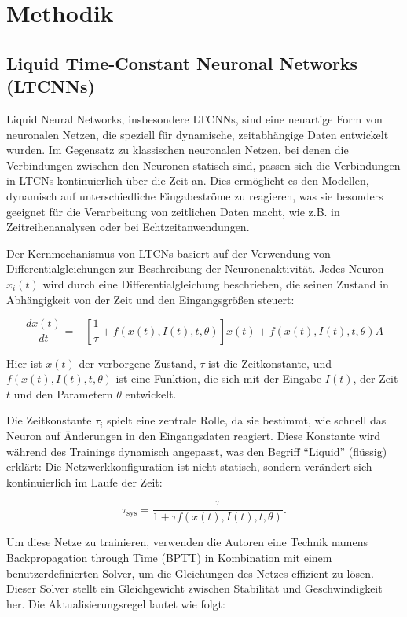 \documentclass[11pt,ngerman,a4paper,]{article}
\begin{document}
\clearpage
\newpage

\section{Methodik}\label{methodik}

\subsection{Liquid Time-Constant Neuronal Networks (LTCNNs)}\label{liquid-time-constant-neuronal-networks-ltcnns}

Liquid Neural Networks, insbesondere LTCNNs, sind eine neuartige Form von neuronalen Netzen, die speziell für dynamische, zeitabhängige Daten entwickelt wurden. Im Gegensatz zu klassischen neuronalen Netzen, bei denen die Verbindungen zwischen den Neuronen statisch sind, passen sich die Verbindungen in LTCNs kontinuierlich über die Zeit an. Dies ermöglicht es den Modellen, dynamisch auf unterschiedliche Eingabeströme zu reagieren, was sie besonders geeignet für die Verarbeitung von zeitlichen Daten macht, wie z.B. in Zeitreihenanalysen oder bei Echtzeitanwendungen.

Der Kernmechanismus von LTCNs basiert auf der Verwendung von Differentialgleichungen zur Beschreibung der Neuronenaktivität. Jedes Neuron \(x_i(t)\) wird durch eine Differentialgleichung beschrieben, die seinen Zustand in Abhängigkeit von der Zeit und den Eingangsgrößen steuert:

\[
\frac{dx(t)}{dt} = -\left[\frac{1}{\tau} + f(x(t), I(t), t, \theta)\right] x(t) + f(x(t), I(t), t, \theta)A
\]

Hier ist \(x(t)\) der verborgene Zustand, \(\tau\) ist die Zeitkonstante, und \(f(x(t), I(t), t, \theta)\) ist eine Funktion, die sich mit der Eingabe \(I(t)\), der Zeit \(t\) und den Parametern \(\theta\) entwickelt.

Die Zeitkonstante \(\tau_i\) spielt eine zentrale Rolle, da sie bestimmt, wie schnell das Neuron auf Änderungen in den Eingangsdaten reagiert. Diese Konstante wird während des Trainings dynamisch angepasst, was den Begriff ``Liquid'' (flüssig) erklärt: Die Netzwerkkonfiguration ist nicht statisch, sondern verändert sich kontinuierlich im Laufe der Zeit:

\[
\tau_{\text{sys}} = \frac{\tau}{1 + \tau f(x(t), I(t), t, \theta)}.
\]

Um diese Netze zu trainieren, verwenden die Autoren eine Technik namens Backpropagation through Time (BPTT) in Kombination mit einem benutzerdefinierten Solver, um die Gleichungen des Netzes effizient zu lösen. Dieser Solver stellt ein Gleichgewicht zwischen Stabilität und Geschwindigkeit her. Die Aktualisierungsregel lautet wie folgt:
\end{document}
